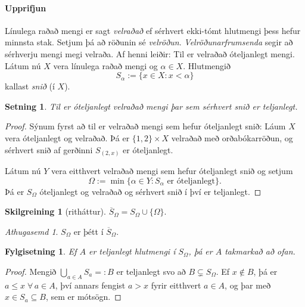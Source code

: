 \documentclass[a4paper,icelandic]{book}
\theoremstyle{definition}
\newtheorem{skilgr}{Skilgreining}[section]
\theoremstyle{plain}
\newtheorem{setn}{Setning}[section]
\newtheorem{fylgisetn}{Fylgisetning}[section]
\theoremstyle{remark}
\newtheorem*{ath}{Athugasemd}
\begin{document}
\paragraph{Upprifjun}

Línulega raðað mengi er sagt \emph{velraðað} ef
sérhvert ekki-tómt hlutmengi þess hefur minnsta stak. Setjum þá að
röðunin sé \emph{velröðun}. \emph{Velröðunarfrumsenda}
segir að sérhverju mengi megi velraða. Af henni leiðir: Til er
velraðað óteljanlegt mengi. Látum nú $X$ vera línulega raðað mengi og
$\alpha\in X$. Hlutmengið \[
S_\alpha := \{ x\in X: x<\alpha \}
\]
kallast \emph{snið} (í $X$).


\begin{setn}
  Til er óteljanlegt velraðað mengi þar sem sérhvert snið er teljanlegt.
\end{setn}
\begin{proof}
  Sýnum fyrst að til er velraðað mengi sem hefur óteljanlegt snið:
  Láum $X$ vera óteljanlegt og velraðað. Þá er $\{1,2\}\times X$
  velraðað með orðabókarröðun, og sérhvert snið af gerðinni
  $S_{(2,x)}$ er óteljanlegt.

  Látum nú $Y$ vera eitthvert velraðað mengi sem hefur óteljanlegt
  snið og setjum \[
  \Omega := \min\{\alpha\in Y: S_\alpha\text{ er óteljanlegt}\}.
  \]
  Þá er $S_\Omega$ óteljanlegt og velraðað og sérhvert snið í því er
  teljanlegt.
\end{proof}
\begin{skilgr}
  [ritháttur]
  $\overline S_\Omega = S_\Omega \cup \{\Omega\}$.
\end{skilgr}
\begin{ath}
  $S_\Omega$ er þétt í $\overline S_\Omega$.
\end{ath}
\begin{fylgisetn}
  Ef $A$ er teljanlegt hlutmengi í $S_\Omega$, þá er $A$ takmarkað að ofan.
\end{fylgisetn}
\begin{proof}
  Mengið $\bigcup_{a\in A} S_a =: B$ er teljanlegt svo að $B\subsetneq
  S_\Omega$. Ef $x\notin B$, þá er $a\leq x\;\forall\,a\in A$, því
  annars fengist $a>x$ fyrir eitthvert $a\in A$, og þar með $x\in
  S_a\subseteq B$, sem er mótsögn.
\end{proof}
\end{document}
